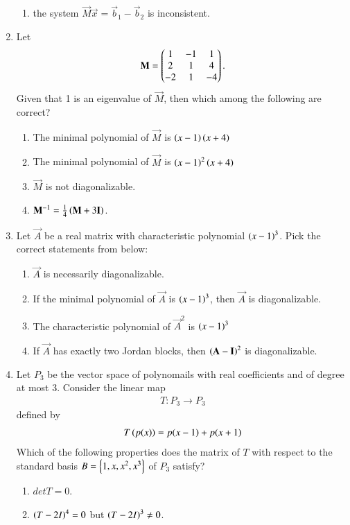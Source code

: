 \begin{enumerate}[label=\thesection.\arabic*.,ref=\thesection.\theenumi]
\begin{enumerate}
\item the system $\vec{M}\vec{x} = \vec{b}_1-\vec{b}_2$ is inconsistent. 
\end{enumerate}
%
\item Let 
\begin{align}
\mathbf{M} = \begin{pmatrix}
1 & -1 & 1 \\
2 & 1 & 4 \\
-2 & 1 & -4 
\end{pmatrix}.
\end{align}
Given that 1 is an eigenvalue of $\vec{M}$, then which among the following
are correct?
\begin{enumerate}
\item The minimal polynomial of  $\vec{M}$ is $\left(x-1\right)\left(x+4\right)$ 
\item The minimal polynomial of  $\vec{M}$ is $\left(x-1\right)^2\left(x+4\right)$ 
\item   $\vec{M}$ is not diagonalizable.
\item $\mathbf{M}^{-1} = \frac{1}{4}\left(\mathbf{M}+3\mathbf{I}\right)$. 
\end{enumerate}
%
\solution

\item Let $\vec{A}$ be a real matrix with characteristic polynomial $\left(x-1\right)^3$.  Pick the correct statements from below:
\begin{enumerate}
\item $\vec{A}$ is necessarily diagonalizable.
\item If the minimal polynomial of  $\vec{A}$ is $\left(x-1\right)^3$, then  $\vec{A}$ is diagonalizable.
\item  The characteristic polynomial of  $\vec{A}^2$ is $\left(x-1\right)^3$
\item If $\vec{A}$ has exactly two Jordan blocks, then $\left(\mathbf{A}-\mathbf{I}\right)^2$ is diagonalizable. 
\end{enumerate}
%
\item Let $P_3$ be the vector space of polynomails with real coefficients and of degree at most 3.  Consider the linear map
\begin{align}
T:P_3\to P_3
\end{align}
defined by 
\begin{align}
T\left(p(x)\right) = p(x-1)+p(x+1)
\end{align}
%
Which of the following properties does the matrix of $T$ with respect to the standard basis
$B = \left\{1,x,x^2,x^3\right\}$ of $P_3$ satisfy?
\begin{enumerate}
\item $det T = 0$.
\item $\left(T-2I\right)^4 = 0$ but $\left(T-2I\right)^3 \ne 0$.

\end{enumerate}
\end{enumerate}
